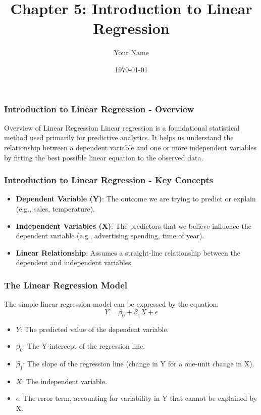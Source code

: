 \documentclass{beamer}
\title{Chapter 5: Introduction to Linear Regression}
\author{Your Name}
\institute{Your Institution}
\date{\today}
\begin{document}
\frame{\titlepage}

\begin{frame}[fragile]
    \frametitle{Introduction to Linear Regression - Overview}
    \begin{block}{Overview of Linear Regression}
        Linear regression is a foundational statistical method used primarily for predictive analytics. It helps us understand the relationship between a dependent variable and one or more independent variables by fitting the best possible linear equation to the observed data.
    \end{block}
\end{frame}

\begin{frame}[fragile]
    \frametitle{Introduction to Linear Regression - Key Concepts}
    \begin{itemize}
        \item \textbf{Dependent Variable (Y)}: The outcome we are trying to predict or explain (e.g., sales, temperature).
        \item \textbf{Independent Variables (X)}: The predictors that we believe influence the dependent variable (e.g., advertising spending, time of year).
        \item \textbf{Linear Relationship}: Assumes a straight-line relationship between the dependent and independent variables.
    \end{itemize}
\end{frame}

\begin{frame}[fragile]
    \frametitle{The Linear Regression Model}
    The simple linear regression model can be expressed by the equation:
    \begin{equation}
        Y = \beta_0 + \beta_1 X + \epsilon
    \end{equation}
    \begin{itemize}
        \item \( Y \): The predicted value of the dependent variable.
        \item \( \beta_0 \): The Y-intercept of the regression line.
        \item \( \beta_1 \): The slope of the regression line (change in Y for a one-unit change in X).
        \item \( X \): The independent variable.
        \item \( \epsilon \): The error term, accounting for variability in Y that cannot be explained by X.
    \end{itemize}
\end{frame}
\end{document}
